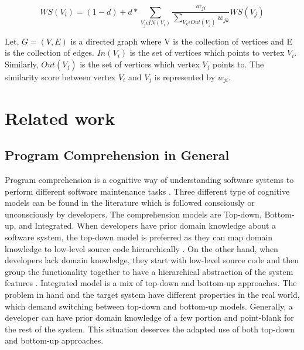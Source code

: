 \begin{equation}
\label{eq:textrank}
    WS(V_i) = (1 - d) + d * \sum_{V_j\epsilon IN(V_i) } \frac{w_{ji}}{\sum_{V_k \epsilon Out(V_j)} w_{jk}}  WS(V_j)
\end{equation}

Let, $ G = (V, E)$ is a directed graph where V is the collection of vertices and E is the collection of edges. $In(V_i)$ is the set of vertices which points to vertex $V_i$. Similarly, $Out(V_j)$ is the set of vertices which vertex $V_j$ points to. The similarity score between vertex $V_i$ and $V_j$ is represented by $w_{ji}$. 


\section{Related work}
\subsection{Program Comprehension in General}
\label{related:program_comprehension}
Program comprehension is a cognitive way of understanding software systems to perform different software maintenance tasks \cite{wei2002surveyCategorizationComprehension, siegmund2016programPastFuture}. Three different type of cognitive models \cite{tilley1998reverseEngineeringFramework, von1993programToolRequirements, siegmund2016programPastFuture} can be found in the literature which is followed consciously or unconsciously by developers. The comprehension models are Top-down, Bottom-up, and Integrated. When developers have prior domain knowledge about a software system, the top-down model is preferred as they can map domain knowledge to low-level source code hierarchically \cite{brooks1983theoryComprehensionPrograms}. On the other hand, when developers lack domain knowledge, they start with low-level source code and then group the functionality together to have a hierarchical abstraction of the system features \cite{shneiderman1979syntacticInteractionsModel, pennington1987stimulusMentalRepresentations}. Integrated model \cite{shaft1995relevanceDomainKnowledge, von1993programToolRequirements} is a mix of top-down and bottom-up approaches. The problem in hand and the target system have different properties in the real world, which demand switching between top-down and bottom-up models. Generally, a developer can have prior domain knowledge of a few portion and point-blank for the rest of the system. This situation deserves the adapted use of both top-down and bottom-up approaches.   


